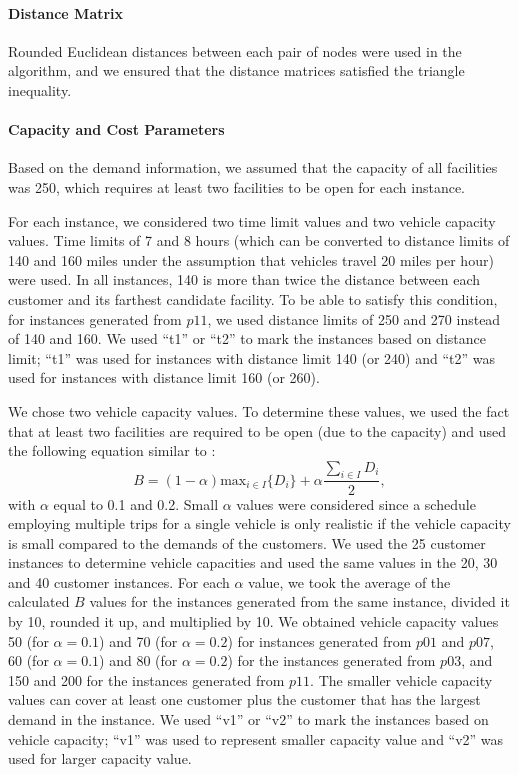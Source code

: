 \paragraph{Distance Matrix}
Rounded Euclidean distances between each pair of nodes were used in
the algorithm, and we ensured that the distance matrices satisfied the triangle
inequality.
\paragraph{Capacity and Cost Parameters}
Based on the demand information, we assumed that the capacity of all facilities
was 250, which requires at least two facilities to be open for each instance.

For each instance, we considered two time limit values and two vehicle capacity
values. Time limits of 7 and 8 hours (which can be converted to distance limits of
140 and 160 miles under the assumption that vehicles travel 20 miles per hour) were used.
In all instances, 140 is more than twice the distance between each customer and its
farthest candidate facility. To be able to satisfy this condition, for instances
generated from $p11$, we used distance limits of 250 and 270 instead of 140 and 160.
We used ``t1'' or ``t2'' to mark the instances based on distance limit; ``t1'' was
used for instances with distance limit 140 (or 240) and ``t2'' was used for instances with
distance limit 160 (or 260).

We chose two vehicle capacity values. To determine these values, we used
the fact that at least two facilities are required to be open (due to the capacity)
and used the following equation similar to \citet{Laporte86}:
\begin{equation}
\label{veccap-calc}
B = (1-\alpha) \mbox{max}_{i \in I}\{D_i\} + \alpha \frac{\sum_{i \in I}D_i}{2},
\end{equation}
with $\alpha$ equal to 0.1 and 0.2. Small $\alpha$ values were considered since
a schedule employing multiple trips for a single vehicle is only realistic
if the vehicle capacity is small compared to the demands of the customers.
We used the 25 customer instances to determine vehicle capacities and used
the same values in the 20, 30 and 40 customer instances.
For each $\alpha$ value, we took the average of the calculated $B$ values
for the instances generated from the same \citet{Cordeau} instance, divided it by 10,
rounded it up, and multiplied by 10.
We obtained vehicle capacity values 50 (for $\alpha=0.1$) and  70 (for $\alpha=0.2$)
for instances generated from $p01$ and $p07$, 60 (for $\alpha=0.1$) and 80
(for $\alpha=0.2$) for the instances generated from $p03$, and 150 and 200
for the instances generated from $p11$. The smaller vehicle capacity
values can cover at least one customer plus the customer that has the largest
demand in the instance. We used ``v1'' or ``v2'' to mark the instances based on
vehicle capacity; ``v1'' was used to represent smaller capacity value
and ``v2'' was used for larger capacity value.

